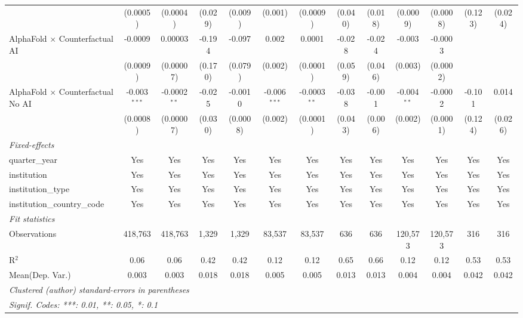 \begin{tabular}{lcccccccccccc}
                                            & (0.0005)       & (0.0004)       & (0.029) & (0.009)  & (0.001)        & (0.0009)       & (0.040) & (0.018) & (0.0009)      & (0.0008)     & (0.123) & (0.024)\\   
   AlphaFold $\times$ Counterfactual AI     & -0.0009        & 0.00003        & -0.194  & -0.097   & 0.002          & 0.0001         & -0.028  & -0.024  & -0.003        & -0.0003      &         &   \\   
                                            & (0.0009)       & (0.00007)      & (0.170) & (0.079)  & (0.002)        & (0.0001)       & (0.059) & (0.046) & (0.003)       & (0.0002)     &         &   \\   
   AlphaFold $\times$ Counterfactual No AI  & -0.003$^{***}$ & -0.0002$^{**}$ & -0.025  & -0.0010  & -0.006$^{***}$ & -0.0003$^{**}$ & -0.038  & -0.001  & -0.004$^{**}$ & -0.0002      & -0.101  & 0.014\\   
                                            & (0.0008)       & (0.00007)      & (0.030) & (0.0008) & (0.002)        & (0.0001)       & (0.043) & (0.006) & (0.002)       & (0.0001)     & (0.124) & (0.026)\\   
   \midrule
   \emph{Fixed-effects}\\
   quarter\_year                            & Yes            & Yes            & Yes     & Yes      & Yes            & Yes            & Yes     & Yes     & Yes           & Yes          & Yes     & Yes\\  
   institution                              & Yes            & Yes            & Yes     & Yes      & Yes            & Yes            & Yes     & Yes     & Yes           & Yes          & Yes     & Yes\\  
   institution\_type                        & Yes            & Yes            & Yes     & Yes      & Yes            & Yes            & Yes     & Yes     & Yes           & Yes          & Yes     & Yes\\  
   institution\_country\_code               & Yes            & Yes            & Yes     & Yes      & Yes            & Yes            & Yes     & Yes     & Yes           & Yes          & Yes     & Yes\\  
   \midrule
   \emph{Fit statistics}\\
   Observations                             & 418,763        & 418,763        & 1,329   & 1,329    & 83,537         & 83,537         & 636     & 636     & 120,573       & 120,573      & 316     & 316\\  
   R$^2$                                    & 0.06           & 0.06           & 0.42    & 0.42     & 0.12           & 0.12           & 0.65    & 0.66    & 0.12          & 0.12         & 0.53    & 0.53\\  
Mean(Dep. Var.) & 0.003 & 0.003 & 0.018 & 0.018 & 0.005 & 0.005 & 0.013 & 0.013 & 0.004 & 0.004 & 0.042 & 0.042 \\
   \midrule \midrule
   \multicolumn{13}{l}{\emph{Clustered (author) standard-errors in parentheses}}\\
   \multicolumn{13}{l}{\emph{Signif. Codes: ***: 0.01, **: 0.05, *: 0.1}}\\
\end{tabular}
\par\endgroup
